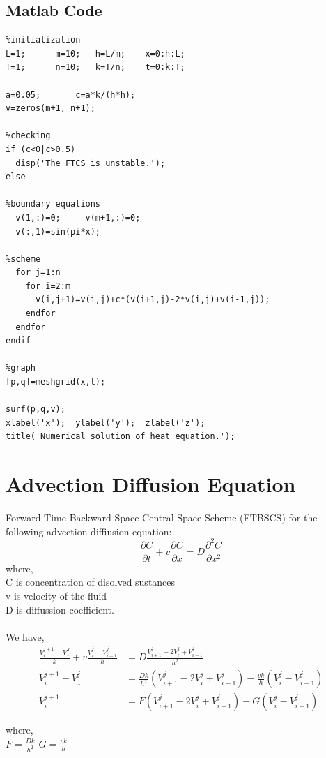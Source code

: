 \documentclass[a4paper,14pt,twoside,onecolumn,openany,final]{memoir}
\begin{document}
\section{Matlab Code}
  \begin{verbatim}
%initialization
L=1;      m=10;   h=L/m;    x=0:h:L;
T=1;      n=10;   k=T/n;    t=0:k:T;

a=0.05;       c=a*k/(h*h);
v=zeros(m+1, n+1);

%checking
if (c<0|c>0.5)
  disp('The FTCS is unstable.');
else

%boundary equations
  v(1,:)=0;     v(m+1,:)=0;
  v(:,1)=sin(pi*x);

%scheme
  for j=1:n
    for i=2:m
      v(i,j+1)=v(i,j)+c*(v(i+1,j)-2*v(i,j)+v(i-1,j));
    endfor
  endfor
endif

%graph
[p,q]=meshgrid(x,t);

surf(p,q,v);
xlabel('x');  ylabel('y');  zlabel('z');
title('Numerical solution of heat equation.');
\end{verbatim}

\chapter{Advection Diffusion Equation}
Forward Time Backward Space Central Space Scheme (FTBSCS) for the following advection diffiusion equation:\\
\[\frac{\partial C}{\partial t} + v\frac{\partial C}{\partial x} = D\frac{\partial^2 C}{\partial x^2}\]
where,\\
C is concentration of disolved sustances \\
v is velocity of the fluid \\
D is diffussion coefficient. \\ \\

We have,
\begin{align*}
  \frac{V_i^{j+1}-V_1^J}{k} + v\frac{V_i^j - V_{i-1}^j}{h} &= D\frac{V_{i+1}^j-2V_i^j+V_{i-1}^j}{h^2}\\
  V_i^{j+1}-V_1^j &= \frac{Dk}{h^2}(V_{i+1}^j-2V_i^j+V_{i-1}^j)-\frac{vk}{h}(V_i^j - V_{i-1}^j)\\
  V_i^{j+1} &= F(V_{i+1}^j-2V_i^j+V_{i-1}^j)-G(V_i^j - V_{i-1}^j)
\end{align*}

where,\\
\(F=\frac{Dk}{h^2}\) \hspace{5mm} \(G= \frac{vk}{h}\)
\end{document}
